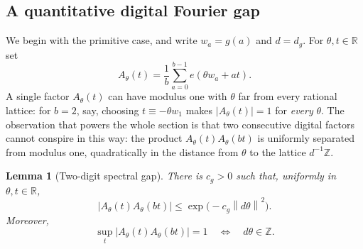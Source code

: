\documentclass[11pt,reqno]{amsart}
\theoremstyle{plain}
\newtheorem{lemma}[theorem]{Lemma}
\theoremstyle{definition}
\newcommand{\Z}{\mathbb{Z}}
\newcommand{\R}{\mathbb{R}}
\newcommand{\ee}[1]{e\!\left(#1\right)}
\newcommand{\1}{\mathbf 1}
\newcommand{\norm}[1]{\left\lVert #1\right\rVert}
\begin{document}
\subsection{A quantitative digital Fourier gap}

We begin with the primitive case, and write $w_a=g(a)$ and $d=d_g$.  For $\theta,t\in\R$ set
\begin{equation}\label{eq:A-theta}
 A_\theta(t)=\frac1b\sum_{a=0}^{b-1}\ee{\theta w_a+at}.
\end{equation}
A single factor $A_\theta(t)$ can have modulus one with $\theta$ far from every rational lattice: for $b=2$, say, choosing $t\equiv-\theta w_1$ makes $|A_\theta(t)|=1$ for \emph{every} $\theta$.  The observation that powers the whole section is that two consecutive digital factors cannot conspire in this way: the product $A_\theta(t)A_\theta(bt)$ is uniformly separated from modulus one, quadratically in the distance from $\theta$ to the lattice $d^{-1}\Z$.

\begin{lemma}[Two-digit spectral gap]\label{lem:square-gap}
There is $c_g>0$ such that, uniformly in $\theta,t\in\R$,
\begin{equation}\label{eq:two-digit-gap}
 |A_\theta(t)A_\theta(bt)|
 \le \exp\bigl(-c_g\norm{d\theta}^2\bigr).
\end{equation}
Moreover,
\[
 \sup_t|A_\theta(t)A_\theta(bt)|=1
 \quad\Longleftrightarrow\quad d\theta\in\Z.
\]
\end{lemma}
\end{document}
